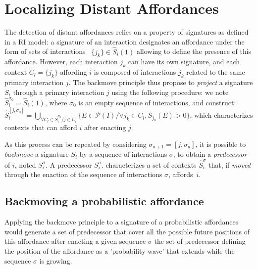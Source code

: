 \documentclass[conference]{IEEEtran}
\begin{document}
\section{Localizing Distant Affordances}

The detection of distant affordances relies on a property of signatures as defined in a RI model: a signature of an interaction designates an affordance under the form of sets of interactions ~$\{j_k\} \in \hat{S}_i(1)$ allowing to define the presence of this affordance.
However, each interaction $j_k$ can have its own signature, and each context $C_l=\{j_k\}$ affording $i$ is composed of interactions $j_k$ related to the same primary interaction $j$. The backmove principle thus propose to \textit{project} a signature $S_i$ through a primary interaction $j$ using the following procedure: we note $\hat{S}_i^{\sigma_0} = \hat{S}_i(1)$, where $\sigma_0$ is an empty sequence of interactions, and construct:
$\hat{S}_i^{[j,\sigma_0]}\!=\!\bigcup_{\forall C_l \in \hat{S}_i^{\sigma_0} / j \in C_l} \{E \in \mathcal{P}(I) / \forall j_k \in C_l, S_{j_k}(E)\!>\!0\}$, which characterizes contexts that can afford $i$ after enacting $j$.

As this process can be repeated by considering $\sigma_{a+1}=[j,\sigma_a]$, it is possible to \textit{backmove} a signature $S_i$ by a sequence of interactions $\sigma$, to obtain a \textit{predecessor} of $i$, noted $S_i^\sigma$. A predecessor $S_i^\sigma$. characterizes a set of contexts $\hat{S}_i^\sigma$ that, if \textit{moved} through the enaction of the sequence of interactions $\sigma$, affords~$i$.



\subsection{Backmoving a probabilistic affordance}

Applying the backmove principle to a signature of a probabilistic affordances would generate a set of predecessor that cover all the possible future positions of this affordance after enacting a given sequence $\sigma$ the set of predecessor defining the position of the affordance as a 'probability wave' that extends while the sequence $\sigma$ is growing.
\end{document}
